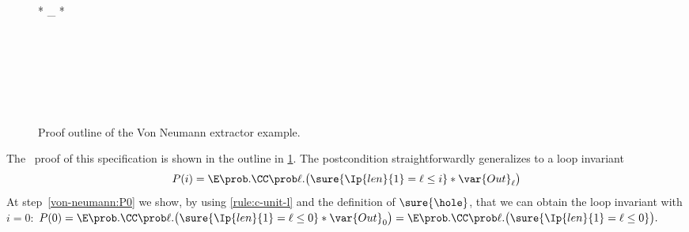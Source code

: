 \documentclass[acmsmall,nonacm,screen,appendix]{acmart}
\newenvironment{mathfig}[1][]{\begin{figure}[tp]\adjustfigure[#1]}{\end{figure}}
\begin{document}
\begin{mathfig}[\small]
\begin{proofoutline}
\begin{proofjump}[rule:wp-loop,"invariant $P(i) =
    \E \prob. \CC \prob \ell. \bigl(
      \sure{\Ip{len}{1} = \ell \leq i} *
      \var{Out}_\ell
    \bigr)$"
  ]
\begin{proofindent}
\begin{proofjump}
\begin{proofindent}
{        
        \\ {}
        * _\ell *
        * 
      }\\
    \end{proofindent}
    \\
  \end{proofjump}
  \\
  \\
  \quad{}
  \end{proofindent}
  \end{proofjump}
  \\
  \end{proofoutline}
  \caption{Proof outline of the Von Neumann extractor example.}
  \label{fig:von-neumann-outline}
\end{mathfig}


The \thelogic\ proof of this specification is shown
in the outline in \cref{fig:von-neumann-outline}.
The postcondition straightforwardly generalizes to a loop invariant
\[
  P(i) =
  \E \prob. \CC \prob \ell. \bigl(
    \sure{\Ip{len}{1} = \ell \leq i} *
    \var{Out}_\ell
  \bigr)
\]
At step~\eqref{von-neumann:P0} we show, by
using \ref{rule:c-unit-l} and the definition of $\sure{\hole}$,
that we can obtain the loop invariant with $i=0$:
$P(0) = \E \prob. \CC \prob \ell. \bigl(
      \sure{\Ip{len}{1} = \ell \leq 0} *
      \var{Out}_0
    \bigr) = \E \prob. \CC \prob \ell. \bigl(
      \sure{\Ip{len}{1} = \ell \leq 0}
    \bigr). $
\end{document}

